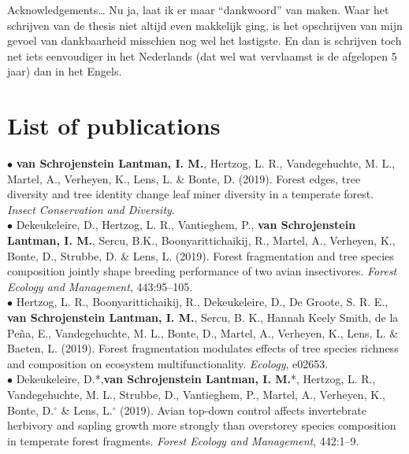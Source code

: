 \documentclass[b5paper,10pt]{book} %
\begin{document}
	
Acknowledgements… Nu ja, laat ik er maar “dankwoord” van maken. Waar het schrijven van de thesis niet altijd even makkelijk ging, is het opschrijven van mijn gevoel van dankbaarheid misschien nog wel het lastigste. En dan is schrijven toch net iets eenvoudiger in het Nederlands (dat wel wat vervlaamst is de afgelopen 5 jaar) dan in het Engels.  

	 



	\newpage
	\thispagestyle{empty}

	\chapter{List of publications}
	\setlength{\parindent}{2em}

	$\bullet$ \textbf{van Schrojenstein Lantman, I. M.}, Hertzog, L. R., Vandegehuchte, M. L., Martel, A., Verheyen, K., Lens, L. \& Bonte, D. (2019). Forest edges, tree diversity and tree identity change leaf miner diversity in a temperate forest. \textit{Insect Conservation and Diversity}.\\

	$\bullet$ Dekeukeleire, D., Hertzog, L. R., Vantieghem, P., \textbf{van Schrojenstein Lantman, I. M.}, Sercu, B.K., Boonyarittichaikij, R., Martel, A., Verheyen, K., Bonte, D., Strubbe, D. \& Lens, L. (2019). Forest fragmentation and tree species composition jointly shape breeding performance of two avian insectivores. \textit{Forest Ecology and Management}, 443:95--105.\\

	$\bullet$ Hertzog, L. R., Boonyarittichaikij, R., Dekeukeleire, D., De Groote, S. R. E., \textbf{van Schrojenstein Lantman, I. M.}, Sercu, B. K., Hannah Keely Smith, de la Peña, E., Vandegehuchte, M. L., Bonte, D., Martel, A., Verheyen, K., Lens, L. \& Baeten, L. (2019). Forest fragmentation modulates effects of tree species richness and composition on ecosystem multifunctionality. \textit{Ecology}, e02653.\\

	$\bullet$ Dekeukeleire, D.*,\textbf{van Schrojenstein Lantman, I. M.}*, Hertzog, L. R., Vandegehuchte, M. L., Strubbe, D., Vantieghem, P., Martel, A., Verheyen, K., Bonte, D.$^\circ$ \& Lens, L.$^\circ$ (2019). Avian top-down control affects invertebrate herbivory and sapling growth more strongly than overstorey species composition in temperate forest fragments. \textit{Forest Ecology and Management}, 442:1--9.\\
\end{document}
